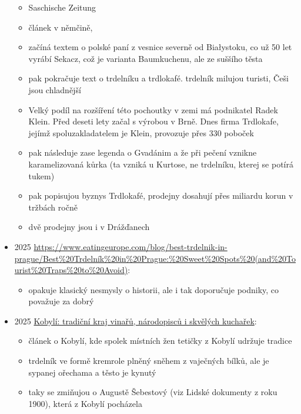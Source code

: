 \begin{itemize}
  \begin{itemize}
  \tightlist
  \item
    Saschische Zeitung
  \item
    článek v němčině,
  \item
    začíná textem o polské paní z vesnice severně od Białystoku, co už
    50 let vyrábí Sekacz, což je varianta Baumkuchenu, ale ze suššího
    těsta
  \item
    pak pokračuje text o trdelníku a trdlokafé. trdelník milujou
    turisti, Češi jsou chladnější
  \item
    Velký podíl na rozšíření této pochoutky v zemi má podnikatel Radek
    Klein. Před deseti lety začal s výrobou v Brně. Dnes firma
    Trdlokafe, jejímž spoluzakladatelem je Klein, provozuje přes 330
    poboček
  \item
    pak následuje zase legenda o Gvadánim a že při pečení vznikne
    karamelizovaná kůrka (ta vzniká u Kurtose, ne trdelníku, kterej se
    potírá tukem)
  \item
    pak popisujou byznys Trdlokafé, prodejny dosahují přes miliardu
    korun v tržbách ročně
  \item
    dvě prodejny jsou i v Drážďanech
  \end{itemize}
\item
  2025
  \url{https://www.eatingeurope.com/blog/best-trdelnik-in-prague/Best\%20Trdelník\%20in\%20Prague:\%20Sweet\%20Spots\%20(and\%20Tourist\%20Traps\%20to\%20Avoid)}:

  \begin{itemize}
  \tightlist
  \item
    opakuje klasický nesmysly o historii, ale i tak doporučuje podniky,
    co považuje za dobrý
  \end{itemize}
\item
  2025
  \href{https://www.lideazeme.cz/clanek/lideazeme-cz-cesko-jihovychod/131289/kobyli-tradicni-kraj-vinaru-narodopiscu-i-skvelych-kucharek.html}{Kobylí:
  tradiční kraj vinařů, národopisců i skvělých kuchařek}:

  \begin{itemize}
  \tightlist
  \item
    článek o Kobylí, kde spolek místních žen tetičky z Kobylí udržuje
    tradice
  \item
    trdelník ve formě kremrole plněný sněhem z vaječných bílků, ale je
    sypanej ořechama a těsto je kynutý
  \item
    taky se zmiňujou o Augustě Šebestový (viz Lidské dokumenty z roku
    1900), která z Kobylí pocházela
  \end{itemize}
\end{itemize}

